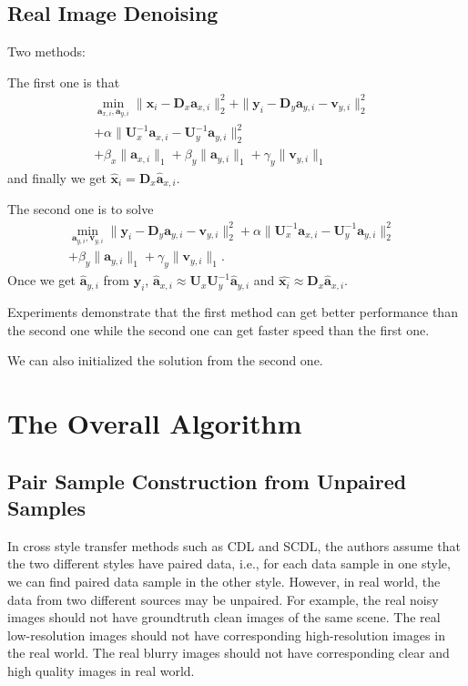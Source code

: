 \documentclass[10pt,twocolumn,letterpaper]{article}
\begin{document}
\subsection{Real Image Denoising}
Two methods:

The first one is that
\begin{equation}
\begin{split}
\min_{\mathbf{a}_{x,i},\mathbf{a}_{y,i}}
\|\mathbf{x}_{i}-\mathbf{D}_{x}\mathbf{a}_{x,i}\|_{2}^{2}
+
\|\mathbf{y}_{i}-\mathbf{D}_{y}\mathbf{a}_{y,i}-\mathbf{v}_{y,i}\|_{2}^{2}
\\
+
\alpha
\|\mathbf{U}_{x}^{-1}\mathbf{a}_{x,i}-\mathbf{U}_{y}^{-1}\mathbf{a}_{y,i}\|_{2}^{2}&
\\
+
\beta_{x}\|\mathbf{a}_{x,i}\|_{1}
+
\beta_{y}\|\mathbf{a}_{y,i}\|_{1}
+
\gamma_{y}\|\mathbf{v}_{y,i}\|_{1}
\end{split}
\end{equation}
and finally we get $\widehat{\mathbf{x}}_{i}=\mathbf{D}_{x}\widehat{\mathbf{a}}_{x,i}$.

The second one is to solve
\begin{equation}
\begin{split}
\min_{\mathbf{a}_{y,i},\mathbf{v}_{y,i}}
\|\mathbf{y}_{i}-\mathbf{D}_{y}\mathbf{a}_{y,i}-\mathbf{v}_{y,i}\|_{2}^{2}
+
\alpha
\|\mathbf{U}_{x}^{-1}\mathbf{a}_{x,i}-\mathbf{U}_{y}^{-1}\mathbf{a}_{y,i}\|_{2}^{2}&
\\
+
\beta_{y}\|\mathbf{a}_{y,i}\|_{1}
+
\gamma_{y}\|\mathbf{v}_{y,i}\|_{1}.
\end{split}
\end{equation}
Once we get $\widehat{\mathbf{a}}_{y,i}$ from $\mathbf{y}_{i}$, $\widehat{\mathbf{a}}_{x,i}\approx\mathbf{U}_{x}\mathbf{U}_{y}^{-1}\widehat{\mathbf{a}}_{y,i}$ and $\widehat{\mathbf{x}_{i}}\approx\mathbf{D}_{x}\widehat{\mathbf{a}}_{x,i}$.

Experiments demonstrate that the first method can get better performance than the second one while the second one can get faster speed than the first one.

We can also initialized the solution from the second one. 

\section{The Overall Algorithm}

\subsection{Pair Sample Construction from Unpaired Samples}
In cross style transfer methods such as CDL and SCDL, the authors assume that the two different styles have paired data, i.e., for each data sample in one style, we can find paired data sample in the other style. However, in real world, the data from two different sources may be unpaired. For example, the real noisy images should not have groundtruth clean images of the same scene. The real low-resolution images should not have corresponding high-resolution images in the real world. The real blurry images should not have corresponding clear and high quality images in real world.
\end{document}
